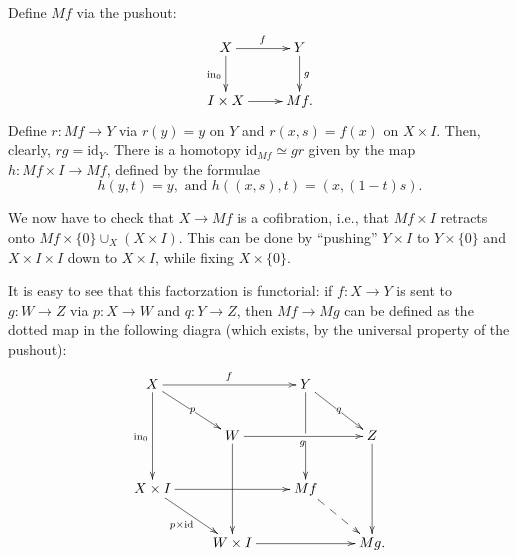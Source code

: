 \begin{solution}
    Define $Mf$ via the pushout:
    \begin{equation*}
	\xymatrix{
	    X\ar[r]^f \ar[d]_{\mathrm{in}_0} & Y\ar[d]^g\\
	    I\times X\ar[r] & Mf.
	    }
    \end{equation*}
    Define $r:Mf\to Y$ via $r(y) = y$ on $Y$ and $r(x,s) = f(x)$ on $X\times I$.
    Then, clearly, $rg = \mathrm{id}_Y$.
    There is a homotopy $\mathrm{id}_{Mf}\simeq gr$ given by the map $h:Mf\times I\to Mf$,
    defined by the formulae
    $$h(y,t) = y,\text{ and }h((x,s),t) = (x,(1-t)s).$$
    
    We now have to check that $X\to Mf$ is a cofibration, i.e., that
    $Mf\times I$ retracts onto $Mf\times\{0\}\cup_X (X\times I)$.
    This can be done by ``pushing'' $Y\times I$ to $Y\times\{0\}$ and $X\times I\times I$ down to $X\times I$,
    while fixing $X\times\{0\}$.
    
    It is easy to see that this factorzation is functorial:
    if $f:X\to Y$ is sent to $g:W\to Z$ via $p:X\to W$ and $q:Y\to Z$,
    then $Mf\to Mg$ can be defined as the dotted map in the following diagra
    (which exists, by the universal property of the pushout):
    \begin{equation*}
	\xymatrix{
	    X\ar[rr]^f\ar[dd]_{\mathrm{in}_0}\ar[dr]|p & & Y\ar[dd]|\hole\ar[dr]|q & \\
	    & W\ar[rr]_g\ar[dd] & & Z\ar[dd]\\
	    X\times I\ar[rr]\ar[dr]_{p\times \mathrm{id}} & & Mf\ar@{-->}[dr] & \\
	    & W\times I\ar[rr] & & Mg.
	    }
    \end{equation*}
\end{solution}

